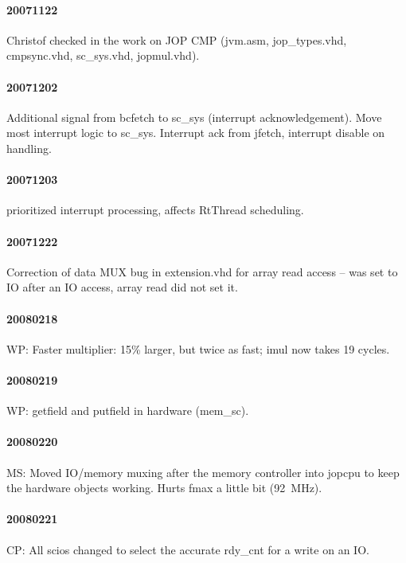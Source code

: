\documentclass[a4paper,12pt]{scrartcl}
\newcommand{\code}[1]{{\textsf{#1}}}
\begin{document}
\paragraph{20071122} Christof checked in the work on JOP CMP
(jvm.asm, jop\_types.vhd, cmpsync.vhd, sc\_sys.vhd,
jopmul.vhd).

\paragraph{20071202} Additional signal from \code{bcfetch} to
\code{sc\_sys} (interrupt acknowledgement). Move most interrupt
logic to \code{sc\_sys}. Interrupt ack from \code{jfetch},
interrupt disable on handling.

\paragraph{20071203} prioritized interrupt processing, affects
RtThread scheduling.

\paragraph{20071222} Correction of data MUX bug in \code{extension.vhd} for array read
access -- was set to IO after an IO access, array read did not set
it.

\paragraph{20080218} WP: Faster multiplier: 15\% larger, but twice as
fast; \code{imul} now takes 19 cycles.

\paragraph{20080219} WP: getfield and putfield in hardware
(\code{mem\_sc}).

\paragraph{20080220} MS: Moved IO/memory muxing after the memory controller into
\code{jopcpu} to keep the hardware objects working. Hurts fmax a
little bit (92~MHz).

\paragraph{20080221} CP: All scios changed to select the accurate rdy\_cnt for a write
on an IO.
\end{document}
